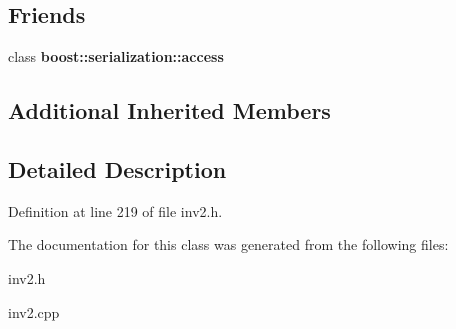 \subsection*{Friends}
\begin{DoxyCompactItemize}
\item 
\hypertarget{class_belt_ac98d07dd8f7b70e16ccb9a01abf56b9c}{}\label{class_belt_ac98d07dd8f7b70e16ccb9a01abf56b9c} 
class {\bfseries boost\+::serialization\+::access}
\end{DoxyCompactItemize}
\subsection*{Additional Inherited Members}


\subsection{Detailed Description}


Definition at line 219 of file inv2.\+h.



The documentation for this class was generated from the following files\+:\begin{DoxyCompactItemize}
\item 
inv2.\+h\item 
inv2.\+cpp\end{DoxyCompactItemize}
